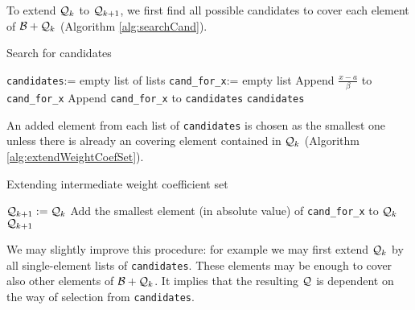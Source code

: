 To extend $\mathcal{Q}_{k}$ to $\mathcal{Q}_{k+1}$, we first find all possible candidates to cover each element of  $\mathcal{B} + \mathcal{Q}_{k}$ (Algorithm \ref{alg:searchCand}). 

\begin{algorithm}
  \caption{Search for candidates}
    \label{alg:searchCand}
  \begin{algorithmic}
    \STATE \verb+candidates+:= empty list of lists
      \STATE \verb+cand_for_x+:= empty list
              \STATE Append $\frac{x-a}{\beta}$ to \verb+cand_for_x+
            \ENDIF
      \ENDFOR 
      \STATE Append \verb+cand_for_x+ to \verb+candidates+
  \ENDFOR
  \RETURN \verb+candidates+
  \end{algorithmic}
\end{algorithm}  


An added element from each list of \verb+candidates+ is chosen as the smallest one unless there is already an covering element contained in $\mathcal{Q}_{k}$ (Algorithm \ref{alg:extendWeightCoefSet}).  

\begin{algorithm}
  \caption{Extending intermediate weight coefficient set}
    \label{alg:extendWeightCoefSet}
  \begin{algorithmic}
    \STATE $\mathcal{Q}_{k+1}:=\mathcal{Q}_{k}$
            \STATE Add the smallest element (in absolute value) of  \verb+cand_for_x+ to $\mathcal{Q}_{k}$  
        \ENDIF
    \ENDFOR
    \RETURN $\mathcal{Q}_{k+1}$
  \end{algorithmic}
\end{algorithm}
    
We may slightly improve this procedure: for example we may first extend $\mathcal{Q}_{k}$ by all single-element lists of \verb+candidates+. These elements may be enough to cover also other elements of $\mathcal{B}+\mathcal{Q}_{k}$. It implies that the resulting $\mathcal{Q}$ is dependent on the way of selection from \verb+candidates+.
  
    
    





